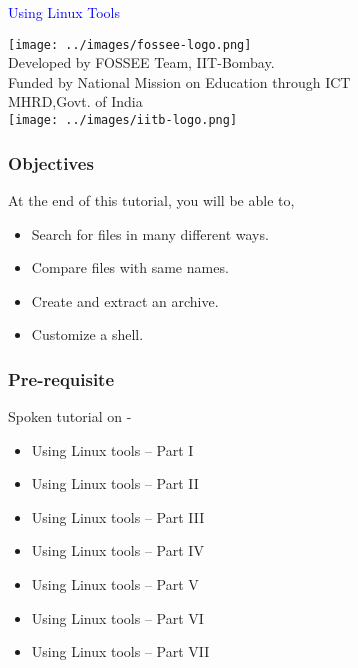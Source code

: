 \documentclass[12pt,compress]{beamer}
\begin{document}
\begin{frame}

\begin{center}
\vspace{12pt}
\textcolor{blue}{\huge Using Linux Tools}
\end{center}
\vspace{18pt}
\begin{center}
\vspace{10pt}
\texttt{[image: ../images/fossee-logo.png]}\\
\vspace{5pt}
\scriptsize Developed by FOSSEE Team, IIT-Bombay. \\ 
\scriptsize Funded by National Mission on Education through ICT\\
\scriptsize  MHRD,Govt. of India\\
\texttt{[image: ../images/iitb-logo.png]}\\
\end{center}
\end{frame}
\begin{frame}
\frametitle{Objectives}
\label{sec-2}

At the end of this tutorial, you will be able to,
\begin{itemize}
\item Search for files in many different ways.
\item Compare files with same names.
\item Create and extract an archive. 
\item Customize a shell.
\end{itemize}
\end{frame}

\begin{frame}
\frametitle{Pre-requisite}
\label{sec-3}

Spoken tutorial on -
\begin{itemize}
\item Using Linux tools -- Part I
\item Using Linux tools -- Part II
\item Using Linux tools -- Part III
\item Using Linux tools -- Part IV
\item Using Linux tools -- Part V
\item Using Linux tools -- Part VI
\item Using Linux tools -- Part VII
\end{itemize}
\end{frame}
\end{document}
